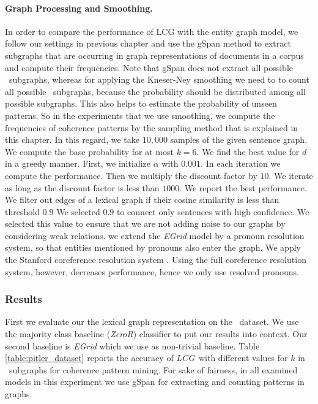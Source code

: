 \paragraph{Graph Processing and Smoothing.} In order to compare the performance of LCG with the entity graph model, we follow
our settings in previous chapter and use the gSpan method \cite{yanxifeng02} to extract subgraphs that are occurring in graph representations of documents in a corpus and compute their frequencies. 
Note that gSpan does not extract all possible \knode\ subgraphs, whereas for applying the \mbox{Kneser-Ney} smoothing we need to  to count all possible \knode\ subgraphs, because the probability should be distributed among all possible subgraphs.  
This also helps to estimate the probability of unseen patterns. 
So in the experiments that we use smoothing, we compute the frequencies of coherence patterns by the sampling method that is explained in this chapter.  
In this regard, we take $10,000$ samples of the given sentence graph. 
We compute the base probability for at most $k = 6$. 
We find the best value for $d$ in a greedy manner. 
First, we initialize $\alpha$ with $0.001$. 
In each iteration we compute the performance. 
Then we multiply the discount factor by $10$. 
We iterate as long as the discount factor is less than $1000$. We report the best performance.
We filter out edges of a lexical graph if their cosine similarity is less than threshold $0.9$
We selected $0.9$ to connect only sentences with high confidence. 
We selected this value to ensure that we are not adding noise to our graphs by considering weak relations.  
we extend the \emph{EGrid} model by a pronoun resolution system, so that entities mentioned by pronouns also enter the graph. 
We apply the Stanford coreference resolution system \cite{leeheeyoung13}. 
Using the full coreference resolution system, however, decreases performance, hence we only use resolved pronouns.



\subsubsection{Results}
First we evaluate our the lexical graph representation on the  \pitlerds\ dataset. 
We use the majority class baseline (\emph{ZeroR}) classifier to put our results into context. 
Our second baseline is \emph{EGrid} \cite{barzilay08} which we use as non-trivial baseline.   
Table \ref{table:pitler_dataset} reports the accuracy of \emph{LCG}\ with different values for $k$ in \knode\ subgraphs for coherence pattern mining. 
For sake of fairness, in all examined models in this experiment we use gSpan for extracting and counting patterns in graphs. 

